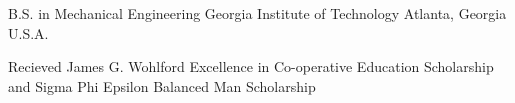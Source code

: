 

\begin{cventries}

  \cventry
    {B.S. in Mechanical Engineering} %
    {Georgia Institute of Technology} %
    {} %
    {Atlanta, Georgia U.S.A.} %
    {
      \begin{cvitems} %
        \item {Recieved James G. Wohlford Excellence in Co-operative Education Scholarship and Sigma Phi Epsilon Balanced Man Scholarship}
      \end{cvitems}
    }

\end{cventries}
